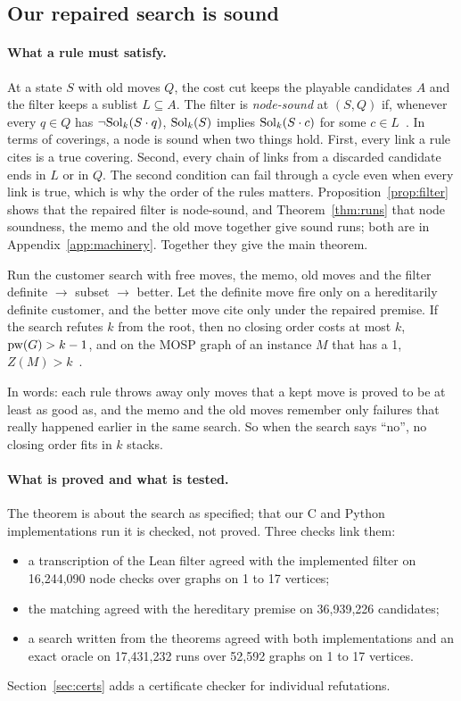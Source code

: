 \subsection{Our repaired search is sound}
\label{sec:theorem}

\paragraph{What a rule must satisfy.} At a state $S$ with old moves $Q$, the
cost cut keeps the playable candidates $A$ and the filter keeps a sublist
$L\subseteq A$. The filter is \emph{node-sound} at $(S,Q)$ if, whenever every
$q\in Q$ has $\neg\mathrm{Sol}_k(S\cdot q)$, $\mathrm{Sol}_k(S)$ implies $\mathrm{Sol}_k(S\cdot c)$ for
some $c\in L$~. In terms of coverings, a node is sound when
two things hold. First, every link a rule cites is a true covering. Second,
every chain of links from a discarded candidate ends in $L$ or in $Q$. The
second condition can fail through a cycle even when every link is true, which
is why the order of the rules matters. Proposition~\ref{prop:filter} shows that
the repaired filter is node-sound, and Theorem~\ref{thm:runs} that node
soundness, the memo and the old move together give sound runs; both are in
Appendix~\ref{app:machinery}. Together they give the main theorem.

\begin{theorem}\label{thm:main}
Run the customer search with free moves, the memo, old moves and the filter
definite $\to$ subset $\to$ better. Let the definite move fire only on a
hereditarily definite customer, and the better move cite only under the
repaired premise. If the search refutes $k$ from the root, then no closing order costs
at most $k$, $\mathrm{pw}(G)>k-1$, and on the MOSP graph of an instance $M$ that has a 1,
$Z(M)>k$~.
\end{theorem}

In words: each rule throws away only moves that a kept move is proved to be at
least as good as, and the memo and the old moves remember only failures that
really happened earlier in the same search. So when the search says ``no'',
no closing order fits in $k$ stacks.

\paragraph{What is proved and what is tested.} The theorem is about the search
as specified; that our C and Python implementations run it is checked, not
proved. Three checks link them:
\begin{itemize}
\item a transcription of the Lean filter agreed with the implemented filter on
  16,244,090 node checks over graphs on 1 to 17 vertices;
\item the matching agreed with the hereditary premise on 36,939,226 candidates;
\item a search written from the theorems agreed with both implementations and
  an exact oracle on 17,431,232 runs over 52,592 graphs on 1 to 17 vertices.
\end{itemize}
Section~\ref{sec:certs} adds a certificate checker for individual
refutations.

